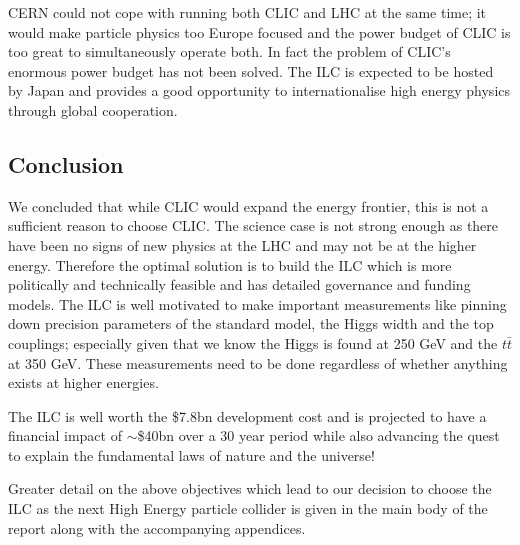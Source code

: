 CERN could not cope with running both CLIC and LHC at the same time; it would make particle physics too Europe focused and the power budget of CLIC is too great to simultaneously operate both. In fact the problem of CLIC’s enormous power budget has not been solved. The ILC is expected to be hosted by Japan and provides a good opportunity to internationalise high energy physics through global cooperation.

\subsection{Conclusion}

We concluded that while CLIC would expand the energy frontier, this is not a sufficient reason to choose CLIC. The science case is not strong enough as there have been no signs of new physics at the LHC and may not be at the higher energy. Therefore the optimal solution is to build the ILC which is more politically and technically feasible and has detailed governance and funding models. The ILC is well motivated to make important measurements like pinning down precision parameters of the standard model, the Higgs width and the top couplings; especially given that we know the Higgs is found at 250 GeV and the $t\bar{t}$  at 350 GeV. These measurements need to be done regardless of whether anything exists at higher energies.

The ILC is well worth the \$7.8bn development cost and is projected to have a financial impact of $\sim$\$40bn over a 30 year period while also advancing the quest to explain the fundamental laws of nature and the universe!

Greater detail on the above objectives which lead to our decision to choose the ILC as the next High Energy particle collider is given in the main body of the report along with the accompanying appendices.